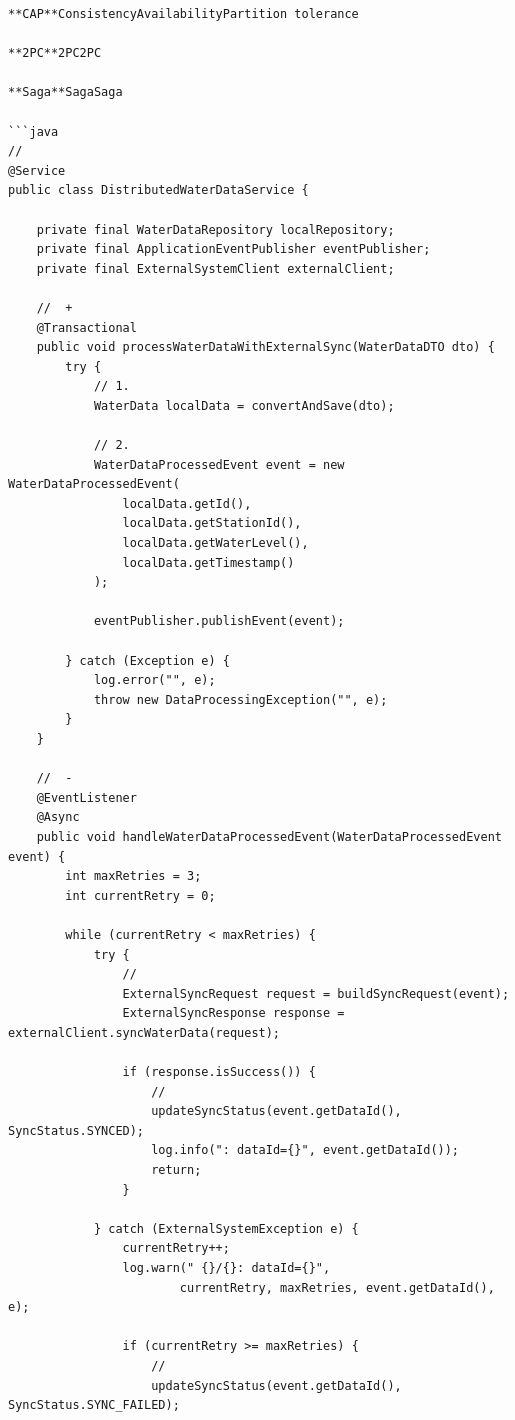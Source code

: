\begin{verbatim}
**CAP**ConsistencyAvailabilityPartition tolerance

**2PC**2PC2PC

**Saga**SagaSaga

```java
// 
@Service
public class DistributedWaterDataService {
    
    private final WaterDataRepository localRepository;
    private final ApplicationEventPublisher eventPublisher;
    private final ExternalSystemClient externalClient;
    
    //  + 
    @Transactional
    public void processWaterDataWithExternalSync(WaterDataDTO dto) {
        try {
            // 1. 
            WaterData localData = convertAndSave(dto);
            
            // 2. 
            WaterDataProcessedEvent event = new WaterDataProcessedEvent(
                localData.getId(), 
                localData.getStationId(),
                localData.getWaterLevel(),
                localData.getTimestamp()
            );
            
            eventPublisher.publishEvent(event);
            
        } catch (Exception e) {
            log.error("", e);
            throw new DataProcessingException("", e);
        }
    }
    
    //  - 
    @EventListener
    @Async
    public void handleWaterDataProcessedEvent(WaterDataProcessedEvent event) {
        int maxRetries = 3;
        int currentRetry = 0;
        
        while (currentRetry < maxRetries) {
            try {
                // 
                ExternalSyncRequest request = buildSyncRequest(event);
                ExternalSyncResponse response = externalClient.syncWaterData(request);
                
                if (response.isSuccess()) {
                    // 
                    updateSyncStatus(event.getDataId(), SyncStatus.SYNCED);
                    log.info(": dataId={}", event.getDataId());
                    return;
                }
                
            } catch (ExternalSystemException e) {
                currentRetry++;
                log.warn(" {}/{}: dataId={}", 
                        currentRetry, maxRetries, event.getDataId(), e);
                
                if (currentRetry >= maxRetries) {
                    // 
                    updateSyncStatus(event.getDataId(), SyncStatus.SYNC_FAILED);
                    

\end{verbatim}
